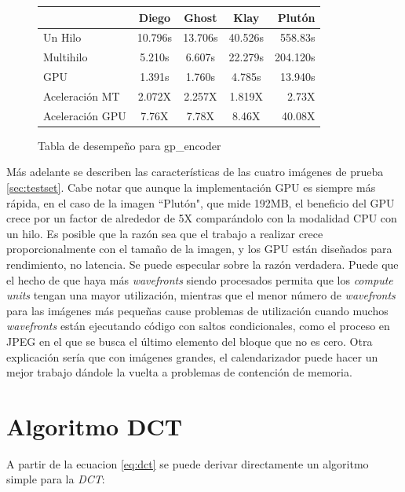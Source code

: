 {\begin{figure}[h]
    \begin{tabular}{ |l c c c r | }
        \hline
                        & Diego & Ghost & Klay & Plutón \\
        \hline
        Un Hilo         & 10.796s  & 13.706s   & 40.526s &   558.83s  \\
        Multihilo       &  5.210s  & 6.607s    & 22.279s &  204.120s  \\
        GPU             &   1.391s & 1.760s   & 4.785s   &  13.940s   \\
        Aceleración MT  &  2.072X  & 2.257X  & 1.819X    &  2.73X    \\
        Aceleración GPU &   7.76X  & 7.78X  & 8.46X      &  40.08X   \\
        \hline
    \end{tabular}
    \caption{Tabla de desempeño para gp\_encoder}
    \label{table:perf_table_orig}
\end{figure}

Más adelante se describen las características de las cuatro imágenes de prueba
\ref{sec:testset}. Cabe notar que aunque la implementación GPU es siempre más
rápida, en el caso de la imagen ``Plutón", que mide 192MB, el beneficio del GPU
crece por un factor de alrededor de 5X comparándolo con la modalidad CPU con un
hilo. Es posible que la razón sea que el trabajo a realizar crece
proporcionalmente con el tamaño de la imagen, y los GPU están diseñados para
rendimiento, no latencia. Se puede especular sobre la razón verdadera. Puede
que el hecho de que haya más \emph{ wavefronts } siendo procesados permita que los
\emph{ compute units } tengan una mayor utilización, mientras que el menor
número de \emph{ wavefronts } para las imágenes más pequeñas cause problemas de
utilización cuando muchos \emph{wavefronts} están ejecutando código con saltos
condicionales, como el proceso en JPEG en el que se busca el último elemento
del bloque que no es cero. Otra explicación sería que con imágenes grandes, el
calendarizador puede hacer un mejor trabajo dándole la vuelta a problemas de
contención de memoria.


\section{Algoritmo DCT} \label{sec:DCT}

A partir de la ecuacion \ref{eq:dct} se puede derivar directamente un algoritmo
simple para la \emph{DCT}:

}
